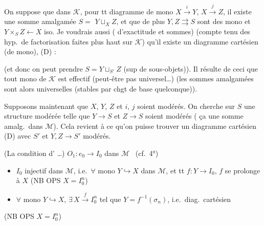\documentclass[11pt,a4paper]{article}
\begin{document}

On suppose que dans $\mathcal{K}$, pour tt diagramme de mono $X
\xrightarrow{i} Y$, $X \xrightarrow{j} Z$, il existe une somme amalgamée $S =$
 $Y \sqcup_X Z$, et que de plus $Y, Z \rightrightarrows S$ sont
des mono et $Y \times_S Z \leftarrow X$ iso. Je voudrais aussi
\struck{\ill{}} (\ill{} d'exactitude et sommes) (compte tenu des hyp.\ de
factorisation faites plus haut sur $\mathcal{K}$) qu'il existe un diagramme
cartésien (de mono), (D) :


(et donc on peut prendre $S = Y \sqcup_{S'} Z$ (sup de sous-objets)). Il
résulte de ceci que tout mono de $\mathcal{K}$ est effectif (peut-être pas
universel\ldots) (les sommes amalgamées sont alors universelles (stables
par chgt de base quelconque)).

Supposons maintenant que $X$, $Y$, $Z$ et $i$, $j$ soient modérés. On
cherche sur $S$ une structure modérée telle que $Y \to S$ et $Z \to S$ soient
modérés ( ça  une somme amalg.\ dans
$\mathcal{M}$). Cela revient  à ce qu'on puisse trouver un
diagramme cartésien (D) avec $S'$ et $Y, Z \to S'$ modérés.

(La condition d'\struck{\ill{}} \ill{} \ldots) \quad $O_1 : e_0 \to I_0$
dans $\mathcal{M}$ \ (cf.\ 4°)
\begin{itemize}
  \item[5°)] $I_0$ injectif dans $\mathcal{M}$, i.e.\ $\forall$ mono $Y
  \hookrightarrow X$ dans $\mathcal{M}$, et tt $f : Y \to I_0$, $f$ se
  prolonge à $X$ (NB OPS $X = I_0^n$)
  \item[6°)] $\forall$ mono $Y \hookrightarrow X$, $\exists\, X
  \xrightarrow{f} I_0^n$ tel que $Y = f^{-1}(\sigma_n)$, i.e.\ diag.\
  cartésien
\end{itemize}


(NB OPS $X = I_0^n$)
\end{document}

